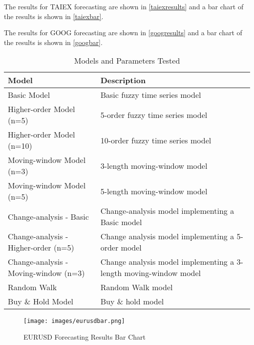 \documentclass[12pt, oneside, a4paper]{article}
\theoremstyle{definition}
\begin{document}
The results for TAIEX forecasting are shown in \cref{taiexresults} and a bar chart of the results is shown in \cref{taiexbar}. 

The results for GOOG forecasting are shown in \cref{googresults} and a bar chart of the results is shown in \cref{googbar}.

\begin{table}[H]
	\center
	\begin{tabulary}{1.0\textwidth}{L|L}
	\toprule[.15em]
	Model & Description \\
	\toprule[.15em]
	Basic Model &  Basic fuzzy time series model\\
	\hline
	Higher-order Model (n=5) & 5-order fuzzy time series model\\
	\hline
	Higher-order Model (n=10) & 10-order fuzzy time series model\\
	\hline
	Moving-window Model (n=3) & 3-length moving-window model\\
	\hline
	Moving-window Model (n=5) & 5-length moving-window model\\
	\hline
	Change-analysis - Basic & Change-analysis model implementing a Basic model\\
	\hline
	Change-analysis - Higher-order (n=5) & Change analysis model implementing a 5-order model\\
	\hline
	Change-analysis - Moving-window (n=3) & Change analysis model implementing a 3-length moving-window model\\
	\hline
	Random Walk & Random Walk model\\
	\hline
	Buy \& Hold Model & Buy \& hold model\\
  	\toprule[.15em]
	\end{tabulary}
	\caption{Models and Parameters Tested}
	\label{params}
\end{table}

\newpage

\begin{figure}[H]
    \centering
    \caption{EURUSD Forecasting Results Bar Chart}
    \texttt{[image: images/eurusdbar.png]}
    \label{eurusdbar}
\end{figure}
\end{document}
